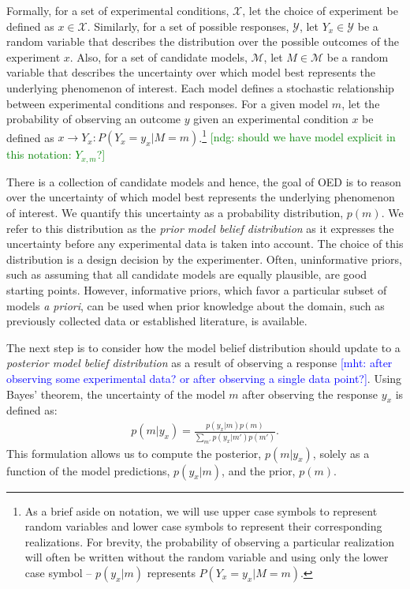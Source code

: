 \documentclass{article}
\newcommand{\ndg}[1]{\textcolor{Green}{[ndg: #1]}}
\newcommand{\mht}[1]{\textcolor{Blue}{[mht: #1]}}
\begin{document}
Formally, for a set of experimental conditions, $\mathcal{X}$, let the choice of experiment be defined as $x \in \mathcal{X}$. Similarly, for a set of possible responses, $\mathcal{Y}$, let $Y_x \in \mathcal{Y}$ be a random variable that describes the distribution over the possible outcomes of the experiment $x$. Also, for a set of candidate models, $\mathcal{M}$, let $M \in \mathcal{M}$ be a random variable that describes the uncertainty over which model best represents the underlying phenomenon of interest. Each model defines a stochastic relationship between experimental conditions and responses. For a given model $m$, let the probability of observing an outcome $y$ given an experimental condition $x$ be defined as $x \rightarrow Y_x: P(Y_x = y_x | M = m)$.\footnote{
As a brief aside on notation, we will use upper case symbols to represent random variables and lower case symbols to represent their corresponding realizations. For brevity, the probability of observing a particular realization will often be written without the random variable and using only the lower case symbol -- $p(y_x|m)$ represents $P(Y_x = y_x | M = m)$.
}
\ndg{should we have model explicit in this notation: $Y_{x,m}$?}

There is a collection of candidate models and hence, the goal of OED is to reason over the uncertainty of which model best represents the underlying phenomenon of interest. We quantify this uncertainty as a probability distribution, $p(m)$. We refer to this distribution as the \emph{prior model belief distribution} as it expresses the uncertainty before any experimental data is taken into account. The choice of this distribution is a design decision by the experimenter. Often, uninformative priors, such as assuming that all candidate models are equally plausible, are good starting points. However, informative priors, which favor a particular subset of models \emph{a priori}, can be used when prior knowledge about the domain, such as previously collected data or established literature, is available.

The next step is to consider how the model belief distribution should update to a \emph{posterior model belief distribution} as a result of observing a response \mht{after observing some experimental data? or after observing a single data point?}. Using Bayes' theorem, the uncertainty of the model $m$ after observing the response $y_x$ is defined as:
\begin{align}
p(m|y_x) = \frac{p(y_x|m)p(m)}{\sum\limits_{m'} p(y_x|m')p(m')}. \label{eq:bayes}
\end{align}
This formulation allows us to compute the posterior, $p(m|y_x)$, solely as a function of the model predictions, $p(y_x|m)$, and the prior, $p(m)$.
\end{document}
